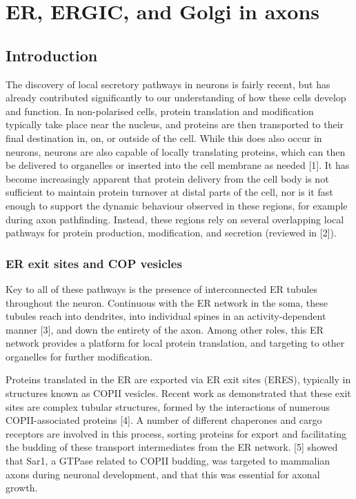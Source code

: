 \documentclass[
  12pt,
  a4paper,
]{article}
\author{}
\date{\vspace{-2.5em}}
\begin{document}
\hypertarget{er-ergic-and-golgi-in-axons}{%
\section{ER, ERGIC, and Golgi in
axons}\label{er-ergic-and-golgi-in-axons}}


\hypertarget{introduction}{%
\subsection{Introduction}\label{introduction}}

The discovery of local secretory pathways in neurons is fairly recent,
but has already contributed significantly to our understanding of how
these cells develop and function. In non-polarised cells, protein
translation and modification typically take place near the nucleus, and
proteins are then transported to their final destination in, on, or
outside of the cell. While this does also occur in neurons, neurons are
also capable of locally translating proteins, which can then be
delivered to organelles or inserted into the cell membrane as needed
{[}1{]}. It has become increasingly apparent that protein delivery from
the cell body is not sufficient to maintain protein turnover at distal
parts of the cell, nor is it fast enough to support the dynamic
behaviour observed in these regions, for example during axon
pathfinding. Instead, these regions rely on several overlapping local
pathways for protein production, modification, and secretion (reviewed
in {[}2{]}).

\hypertarget{er-exit-sites-and-cop-vesicles}{%
\subsubsection{ER exit sites and COP
vesicles}\label{er-exit-sites-and-cop-vesicles}}

Key to all of these pathways is the presence of interconnected ER
tubules throughout the neuron. Continuous with the ER network in the
soma, these tubules reach into dendrites, into individual spines in an
activity-dependent manner {[}3{]}, and down the entirety of the axon.
Among other roles, this ER network provides a platform for local protein
translation, and targeting to other organelles for further modification.

Proteins translated in the ER are exported via ER exit sites (ERES),
typically in structures known as COPII vesicles. Recent work as
demonstrated that these exit sites are complex tubular structures,
formed by the interactions of numerous COPII-associated proteins
{[}4{]}. A number of different chaperones and cargo receptors are
involved in this process, sorting proteins for export and facilitating
the budding of these transport intermediates from the ER network.
{[}5{]} showed that Sar1, a GTPase related to COPII budding, was
targeted to mammalian axons during neuronal development, and that this
was essential for axonal growth.
\end{document}
